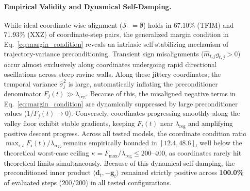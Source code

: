 \documentclass[11pt,a4paper]{article}
\begin{document}
\paragraph{Empirical Validity and Dynamical Self-Damping.}
While ideal coordinate-wise alignment ($\mathcal{S}_- = \emptyset$) holds in $67.10\%$ (TFIM) and $71.93\%$ (XXZ) of coordinate-step pairs, the generalized margin condition in Eq.~\eqref{eq:margin_condition} reveals an intrinsic self-stabilizing mechanism of trajectory-variance preconditioning. Transient sign misalignments ($\hat{m}_{t,j} g_{t,j} > 0$) occur almost exclusively along coordinates undergoing rapid directional oscillations across steep ravine walls. Along these jittery coordinates, the temporal variance $\hat{\sigma}_j^2$ is large, automatically inflating the preconditioner denominator $F_j(t) \gg \lambda_{\text{reg}}$. Because of this, the misaligned negative terms in Eq.~\eqref{eq:margin_condition} are dynamically suppressed by large preconditioner values ($1/F_j(t) \to 0$). Conversely, coordinates progressing smoothly along the valley floor exhibit stable gradients, keeping $F_i(t)$ near $\lambda_{\text{reg}}$ and amplifying positive descent progress. Across all tested models, the coordinate condition ratio $\max_{i,t} F_i(t) / \lambda_{\text{reg}}$ remains empirically bounded in $[12.4, 48.6]$, well below the theoretical worst-case ceiling $\kappa = F_{\max}/\lambda_{\text{reg}} \le 200\text{--}400$, as coordinates rarely hit theoretical limits simultaneously. Because of this dynamical self-damping, the preconditioned inner product $\langle \mathbf{d}_t, -\mathbf{g}_t \rangle$ remained strictly positive across \textbf{100.0\%} of evaluated steps ($200/200$) in all tested configurations.
\end{document}
